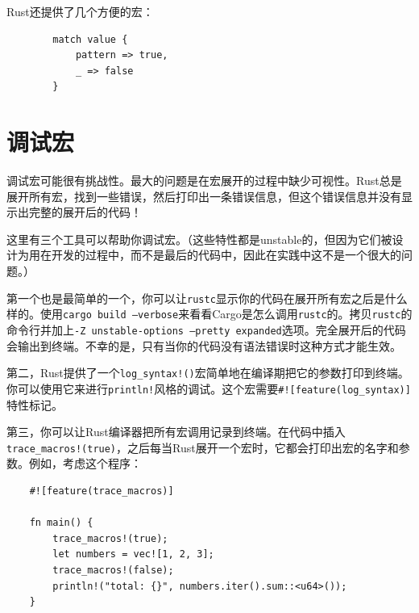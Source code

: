 Rust还提供了几个方便的宏：




\begin{verbatim}
        match value {
            pattern => true,
            _ => false
        }
\end{verbatim}


\section{调试宏}\label{DebugMacro}
调试宏可能很有挑战性。最大的问题是在宏展开的过程中缺少可视性。Rust总是展开所有宏，找到一些错误，然后打印出一条错误信息，但这个错误信息并没有显示出完整的展开后的代码！

这里有三个工具可以帮助你调试宏。（这些特性都是unstable的，但因为它们被设计为用在开发的过程中，而不是最后的代码中，因此在实践中这不是一个很大的问题。）

第一个也是最简单的一个，你可以让\texttt{rustc}显示你的代码在展开所有宏之后是什么样的。使用\texttt{cargo build --verbose}来看看Cargo是怎么调用\texttt{rustc}的。拷贝\texttt{rustc}的命令行并加上\texttt{-Z unstable-options --pretty expanded}选项。完全展开后的代码会输出到终端。不幸的是，只有当你的代码没有语法错误时这种方式才能生效。

第二，Rust提供了一个\texttt{log\_syntax!()}宏简单地在编译期把它的参数打印到终端。你可以使用它来进行\texttt{println!}风格的调试。这个宏需要\texttt{\#![feature(log\_syntax)]}特性标记。

第三，你可以让Rust编译器把所有宏调用记录到终端。在代码中插入\texttt{trace\_macros!(true)}，之后每当Rust展开一个宏时，它都会打印出宏的名字和参数。例如，考虑这个程序：
\begin{verbatim}
    #![feature(trace_macros)]

    fn main() {
        trace_macros!(true);
        let numbers = vec![1, 2, 3];
        trace_macros!(false);
        println!("total: {}", numbers.iter().sum::<u64>());
    }
\end{verbatim}

